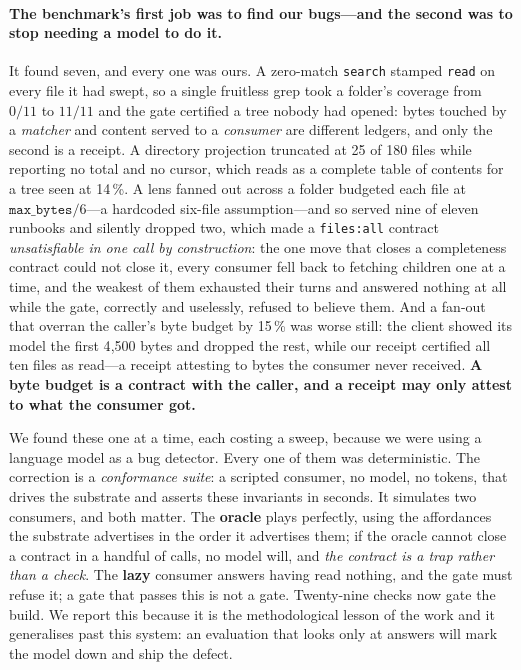 \documentclass[10pt,twocolumn]{article}
\newcommand{\tok}[1]{\texttt{#1}}
\begin{document}
\paragraph{The benchmark's first job was to find our bugs---and the second was to
stop needing a model to do it.} It found seven, and every one was ours. A
zero-match \tok{search} stamped \tok{read} on every file it had swept, so a
single fruitless grep took a folder's coverage from $0/11$ to $11/11$ and the
gate certified a tree nobody had opened: bytes touched by a \emph{matcher} and
content served to a \emph{consumer} are different ledgers, and only the second is
a receipt. A directory projection truncated at 25 of 180 files while reporting no
total and no cursor, which reads as a complete table of contents for a tree seen
at 14\,\%. A lens fanned out across a folder budgeted each file at
$\texttt{max\_bytes}/6$---a hardcoded six-file assumption---and so served nine of
eleven runbooks and silently dropped two, which made a \texttt{files:all} contract
\emph{unsatisfiable in one call by construction}: the one move that closes a
completeness contract could not close it, every consumer fell back to fetching
children one at a time, and the weakest of them exhausted their turns and
answered nothing at all while the gate, correctly and uselessly, refused to
believe them. And a fan-out that overran the caller's byte budget by 15\,\% was
worse still: the client showed its model the first 4{,}500 bytes and dropped the
rest, while our receipt certified all ten files as read---a receipt attesting to
bytes the consumer never received. \textbf{A byte budget is a contract with the
caller, and a receipt may only attest to what the consumer got.}

We found these one at a time, each costing a sweep, because we were using a
language model as a bug detector. Every one of them was deterministic. The
correction is a \emph{conformance suite}: a scripted consumer, no model, no
tokens, that drives the substrate and asserts these invariants in seconds. It
simulates two consumers, and both matter. The \textbf{oracle} plays perfectly,
using the affordances the substrate advertises in the order it advertises them;
if the oracle cannot close a contract in a handful of calls, no model will, and
\emph{the contract is a trap rather than a check}. The \textbf{lazy} consumer
answers having read nothing, and the gate must refuse it; a gate that passes this
is not a gate. Twenty-nine checks now gate the build. We report this because it
is the methodological lesson of the work and it generalises past this system: an
evaluation that looks only at answers will mark the model down and ship the
defect.
\end{document}
